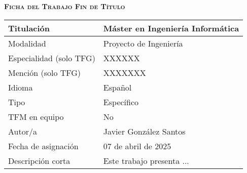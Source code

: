 \textsc{\textbf{Ficha del Trabajo Fin de Título}}

\begin{tabular}{|l|p{10cm}|}
    \hline \hline
    Titulación & Máster en Ingeniería Informática \\ \hline
    Modalidad & Proyecto de Ingeniería \\ \hline
    Especialidad (solo TFG) & XXXXXX \\ \hline
    Mención (solo TFG) & XXXXXXX \\ \hline
    Idioma & Español \\ \hline
    Tipo & Específico \\ \hline
    TFM en equipo & No \\ \hline
    Autor/a & Javier González Santos \\ \hline
    Fecha de asignación & 07 de abril de 2025  \\ \hline
    Descripción corta & Este trabajo presenta ... \\ \hline
    \hline
\end{tabular}
  